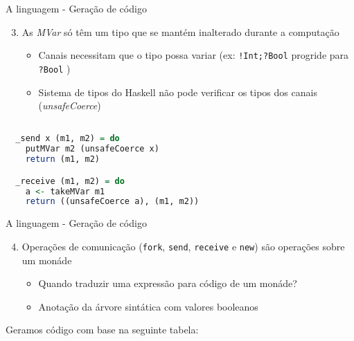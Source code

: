\begin{frame}[fragile]{A linguagem - Geração de código}
  \begin{enumerate}
    \setcounter{enumi}{2}    
  \item As \textit{MVar} só têm um tipo que se mantém inalterado durante a computação
    \begin{itemize}
    \item Canais necessitam que o tipo possa variar (ex:
      \lstinline|!Int;?Bool| progride para \lstinline|?Bool| )
    \item Sistema de tipos do Haskell não pode verificar os tipos dos canais (\textit{unsafeCoerce})
    \end{itemize}
  \end{enumerate}
  \begin{lstlisting}[language=Haskell]

  _send x (m1, m2) = do
    putMVar m2 (unsafeCoerce x)
    return (m1, m2)

  _receive (m1, m2) = do
    a <- takeMVar m1
    return ((unsafeCoerce a), (m1, m2))
\end{lstlisting}
\end{frame}

\begin{frame}[fragile]{A linguagem - Geração de código}
  \begin{enumerate}
    \setcounter{enumi}{3}  
  \item Operações de comunicação (\lstinline|fork|, \lstinline|send|, \lstinline|receive| e \lstinline|new|) são operações sobre um monáde
    \begin{itemize}
    \item Quando traduzir uma expressão para código de um monáde?
    \item Anotação da árvore sintática com valores booleanos
    \end{itemize}
  \end{enumerate}
  Geramos código com base na seguinte tabela:
  \vskip 0.2cm
\end{frame}

